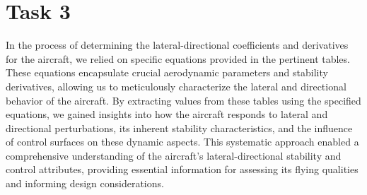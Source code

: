 \documentclass[a4paper, twoside]{article}
\begin{document}
\section{Task 3}
In the process of determining the lateral-directional coefficients and derivatives for the aircraft, we relied on specific equations provided in the pertinent tables. These equations encapsulate crucial aerodynamic parameters and stability derivatives, allowing us to meticulously characterize the lateral and directional behavior of the aircraft. By extracting values from these tables using the specified equations, we gained insights into how the aircraft responds to lateral and directional perturbations, its inherent stability characteristics, and the influence of control surfaces on these dynamic aspects. This systematic approach enabled a comprehensive understanding of the aircraft's lateral-directional stability and control attributes, providing essential information for assessing its flying qualities and informing design considerations.
\end{document}
